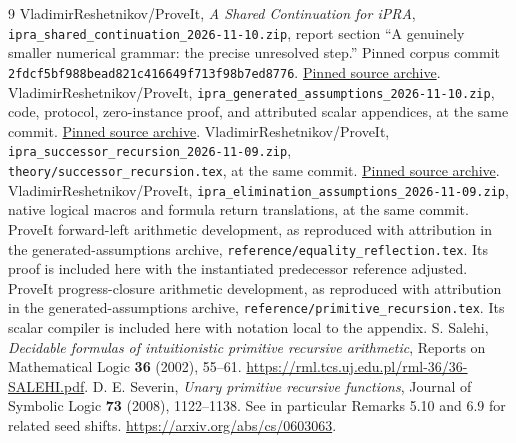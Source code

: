 \documentclass[11pt,letterpaper]{article}
\theoremstyle{definition}\newtheorem{definition}[theorem]{Definition}
\theoremstyle{remark}\newtheorem{remark}[theorem]{Remark}
\newcommand{\file}[1]{{\small\nolinkurl{#1}}}
\begin{document}
\begin{thebibliography}{9}
VladimirReshetnikov/ProveIt,
\emph{A Shared Continuation for iPRA},
\file{ipra_shared_continuation_2026-11-10.zip}, report section
``A genuinely smaller numerical grammar: the precise unresolved step.''
Pinned corpus commit \file{2fdcf5bf988bead821c416649f713f98b7ed8776}.
\href{https://github.com/VladimirReshetnikov/ProveIt/blob/2fdcf5bf988bead821c416649f713f98b7ed8776/docs/drafts/ipra_shared_continuation_2026-11-10.zip}{Pinned source archive}.
VladimirReshetnikov/ProveIt,
\file{ipra_generated_assumptions_2026-11-10.zip}, code, protocol,
zero-instance proof, and attributed scalar appendices, at the same commit.
\href{https://github.com/VladimirReshetnikov/ProveIt/blob/2fdcf5bf988bead821c416649f713f98b7ed8776/docs/drafts/ipra_generated_assumptions_2026-11-10.zip}{Pinned source archive}.
VladimirReshetnikov/ProveIt,
\file{ipra_successor_recursion_2026-11-09.zip},
\file{theory/successor_recursion.tex}, at the same commit.
\href{https://github.com/VladimirReshetnikov/ProveIt/blob/2fdcf5bf988bead821c416649f713f98b7ed8776/docs/drafts/ipra_successor_recursion_2026-11-09.zip}{Pinned source archive}.
VladimirReshetnikov/ProveIt,
\file{ipra_elimination_assumptions_2026-11-09.zip}, native logical
macros and formula return translations, at the same commit.
ProveIt forward-left arithmetic development,
as reproduced with attribution in the generated-assumptions archive,
\file{reference/equality_reflection.tex}. Its proof is included here with
the instantiated predecessor reference adjusted.
ProveIt progress-closure arithmetic development,
as reproduced with attribution in the generated-assumptions archive,
\file{reference/primitive_recursion.tex}. Its scalar compiler is included
here with notation local to the appendix.
S. Salehi, \emph{Decidable formulas of intuitionistic
primitive recursive arithmetic}, Reports on Mathematical Logic
\textbf{36} (2002), 55--61.
\url{https://rml.tcs.uj.edu.pl/rml-36/36-SALEHI.pdf}.
D. E. Severin, \emph{Unary primitive recursive functions},
Journal of Symbolic Logic \textbf{73} (2008), 1122--1138.
See in particular Remarks 5.10 and 6.9 for related seed shifts.
\url{https://arxiv.org/abs/cs/0603063}.
\end{thebibliography}
\end{document}
